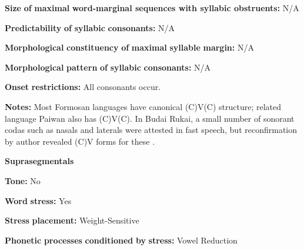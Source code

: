 \begin{styleBody}
\textbf{Size} \textbf{of} \textbf{maximal} \textbf{word{}-marginal sequences with syllabic obstruents:} N/A
\end{styleBody}

\begin{styleBody}
\textbf{Predictability} \textbf{of} \textbf{syllabic} \textbf{consonants:} N/A
\end{styleBody}

\begin{styleBody}
\textbf{Morphological} \textbf{constituency} \textbf{of} \textbf{maximal} \textbf{syllable} \textbf{margin:} N/A
\end{styleBody}

\begin{styleBody}
\textbf{Morphological} \textbf{pattern} \textbf{of} \textbf{syllabic} \textbf{consonants:} N/A
\end{styleBody}

\begin{styleBody}
\textbf{Onset} \textbf{restrictions:} All consonants occur.
\end{styleBody}

\begin{styleBody}
\textbf{Notes:} Most Formosan languages have canonical (C)V(C) structure; related language Paiwan also has (C)V(C). In Budai Rukai, a small number of sonorant codas such as nasals and laterals were attested in fast speech, but reconfirmation by author revealed (C)V forms for these \citep[213]{Chen2006}.
\end{styleBody}

\begin{styleBody}
\textbf{Suprasegmentals}
\end{styleBody}

\begin{styleBody}
\textbf{Tone:} No
\end{styleBody}

\begin{styleBody}
\textbf{Word} \textbf{stress:} Yes
\end{styleBody}

\begin{styleBody}
\textbf{Stress} \textbf{placement:} Weight-Sensitive
\end{styleBody}

\begin{styleBody}
\textbf{Phonetic} \textbf{processes} \textbf{conditioned} \textbf{by} \textbf{stress:} Vowel Reduction
\end{styleBody}

